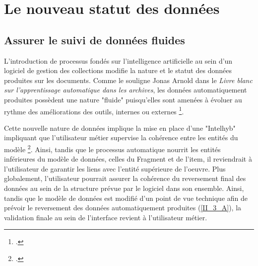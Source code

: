 \section{\label{III_1_A} Le nouveau statut des données}

\subsection{Assurer le suivi de données fluides}
L'introduction de processus fondés sur l'intelligence artificielle au sein d'un logiciel de gestion des collections modifie la nature et le statut des données produites sur les documents. Comme le souligne Jonas Arnold dans le \textit{Livre blanc sur l'apprentissage automatique dans les archives}, les données automatiquement produites possèdent une nature "fluide" puisqu'elles sont amenées à évoluer au rythme des améliorations des outils, internes ou externes \footcite{zotero-item-584}. 

Cette nouvelle nature de données implique la mise en place d'une "\gls{Intelhyb}" impliquant que l'utilisateur métier supervise la cohérence entre les entités du modèle \footcite{akata2020}. Ainsi, tandis que le processus automatique nourrit les entités inférieures du modèle de données, celles du Fragment et de l'\gls{item}, il reviendrait à l'utilisateur de garantir les liens avec l'entité supérieure de l'\gls{oeuvre}. Plus globalement, l'utilisateur pourrait assurer la cohérence du reversement final des données au sein de la structure prévue par le logiciel dans son ensemble. Ainsi, tandis que le modèle de données est modifié d'un point de vue technique afin de prévoir le reversement des données automatiquement produites (\ref{II_3_A}), la validation finale au sein de l'interface revient à l'utilisateur métier.

